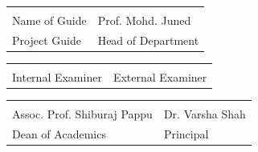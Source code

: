 \vspace{1.5cm}
\begin{flushleft}
	\begin{tabular}{p{10cm} p{10cm}}
		\underline{\hspace{5cm}} & \underline{\hspace{5cm}} \\
		Name of Guide & Prof. Mohd. Juned \\
		Project Guide & Head of Department \\
	\end{tabular}
	
	\vspace{1.5cm}
	\begin{tabular}{p{10cm} p{10cm}}
		\underline{\hspace{5cm}} & \underline{\hspace{5cm}} \\
		Internal Examiner & External Examiner \\
	\end{tabular}
	
	
	\vspace{1.5cm}
	\begin{tabular}{p{10cm} p{10cm}}
		\underline{\hspace{5cm}} & \underline{\hspace{5cm}} \\
		Assoc. Prof. Shiburaj Pappu & Dr. Varsha Shah \\
		Dean of Academics & Principal \\
	\end{tabular}
	
\end{flushleft}
\vspace*{\fill}